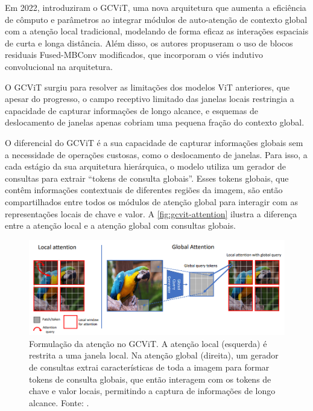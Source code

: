 Em 2022,  introduziram o GCViT, uma nova arquitetura que aumenta a eficiência de cômputo e parâmetros ao integrar módulos de auto-atenção de contexto global com a atenção local tradicional, modelando de forma eficaz as interações espaciais de curta e longa distância. Além disso, os autores propuseram o uso de blocos residuais Fused-MBConv modificados, que incorporam o viés indutivo convolucional na arquitetura.

O GCViT surgiu para resolver as limitações dos modelos ViT anteriores, que apesar do progresso, o campo receptivo limitado das janelas locais restringia a capacidade de capturar informações de longo alcance, e esquemas de deslocamento de janelas apenas cobriam uma pequena fração do contexto global.

O diferencial do GCViT é a sua capacidade de capturar informações globais sem a necessidade de operações custosas, como o deslocamento de janelas. Para isso, a cada estágio da sua arquitetura hierárquica, o modelo utiliza um gerador de consultas para extrair ``tokens de consulta globais''. Esses tokens globais, que contêm informações contextuais de diferentes regiões da imagem, são então compartilhados entre todos os módulos de atenção global para interagir com as representações locais de chave e valor. A \autoref{fig:gcvit-attention} ilustra a diferença entre a atenção local e a atenção global com consultas globais.

\begin{figure}[!htbp]
    \centering
    \includegraphics[width=\linewidth]{figs/gcvit-attention.png}
    \caption{Formulação da atenção no GCViT. A atenção local (esquerda) é restrita a uma janela local. Na atenção global (direita), um gerador de consultas extrai características de toda a imagem para formar tokens de consulta globais, que então interagem com os tokens de chave e valor locais, permitindo a captura de informações de longo alcance. Fonte: .}
    \label{fig:gcvit-attention}
\end{figure}

